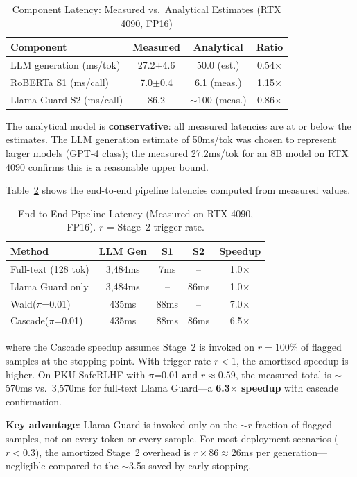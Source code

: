 \documentclass[acmtjournal, acmnowidth]{acmart}
\theoremstyle{definition}
\begin{document}
\begin{table}[h]
\caption{Component Latency: Measured vs.\ Analytical Estimates (RTX 4090, FP16)}
\label{tab:latency_measured}
\begin{tabular}{lccc}
\toprule
Component & Measured & Analytical & Ratio \\
\midrule
LLM generation (ms/tok) & 27.2$\pm$4.6 & 50.0 (est.) & 0.54$\times$ \\
RoBERTa S1 (ms/call) & 7.0$\pm$0.4 & 6.1 (meas.) & 1.15$\times$ \\
Llama Guard S2 (ms/call) & 86.2 & $\sim$100 (meas.) & 0.86$\times$ \\
\bottomrule
\end{tabular}
\end{table}

The analytical model is \textbf{conservative}: all measured latencies are at or below the estimates. The LLM generation estimate of 50ms/tok was chosen to represent larger models (GPT-4 class); the measured 27.2ms/tok for an 8B model on RTX 4090 confirms this is a reasonable upper bound.

Table~\ref{tab:latency} shows the end-to-end pipeline latencies computed from measured values.

\begin{table}[h]
\caption{End-to-End Pipeline Latency (Measured on RTX 4090, FP16). $r$ = Stage~2 trigger rate.}
\label{tab:latency}
\begin{tabular}{lcccc}
\toprule
Method & LLM Gen & S1 & S2 & Speedup \\
\midrule
Full-text (128 tok) & 3,484ms & 7ms & -- & 1.0$\times$ \\
Llama Guard only & 3,484ms & -- & 86ms & 1.0$\times$ \\
Wald($\pi$=0.01) & 435ms & 88ms & -- & 7.0$\times$ \\
Cascade($\pi$=0.01) & 435ms & 88ms & 86ms & 6.5$\times$ \\
\bottomrule
\end{tabular}
\end{table}

where the Cascade speedup assumes Stage~2 is invoked on $r = 100\%$ of flagged samples at the stopping point. With trigger rate $r < 1$, the amortized speedup is higher. On PKU-SafeRLHF with $\pi$=0.01 and $r \approx 0.59$, the measured total is ${\sim}$570ms vs.\ 3,570ms for full-text Llama Guard---a \textbf{6.3$\times$ speedup} with cascade confirmation.

\textbf{Key advantage}: Llama Guard is invoked only on the ${\sim}r$ fraction of flagged samples, not on every token or every sample. For most deployment scenarios ($r < 0.3$), the amortized Stage~2 overhead is $r \times 86 \approx 26$ms per generation---negligible compared to the ${\sim}$3.5s saved by early stopping.
\end{document}
